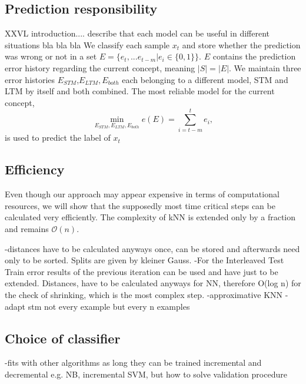 \documentclass[conference]{IEEEtran}
\begin{document}
\subsection{Prediction responsibility}
XXVL introduction.... describe that each model can be useful in different situations bla bla bla
We classify each sample $x_t$ and store whether the prediction was wrong or not in a set $E=\{e_t,...e_{t-m}|e_i \in \{0,1\}\}$. $E$ contains
the prediction error history regarding the current concept, meaning $|S|=|E|$. We maintain three error histories $E_{STM}$,$E_{LTM},E_{both}$ each belonging to a different model, STM and LTM by itself and both combined. 
The most reliable model for the current concept, 
\begin{equation*}
\min\limits_{E_{STM},E_{LTM},E_{both}}e(E)=\sum_{i=t-m}^{t} e_i,
\end{equation*}
is used to predict the label of $x_t$
\subsection{Efficiency}\label{efficiency}
Even though our approach may appear expensive in terms of computational resources, we will show that the supposedly most time critical steps can be calculated very efficiently. The complexity of 
kNN is extended only by a fraction and remains $\mathcal{O}(n)$.

-distances have to be calculated anyways once, can be stored and afterwards need only to be sorted. Splits are given by kleiner Gauss.
-For the Interleaved Test Train error results of the previous iteration can be used and have just to be extended. Distances, have to be calculated anyways for NN,
therefore O(log n) for the check of shrinking, which is the most complex step.
-approximative KNN
-adapt stm not every example but every n examples

\subsection{Choice of classifier}
-fits with other algorithms as long they can be trained incremental and decremental e.g. NB, incremental SVM, but how to solve validation procedure
\end{document}
